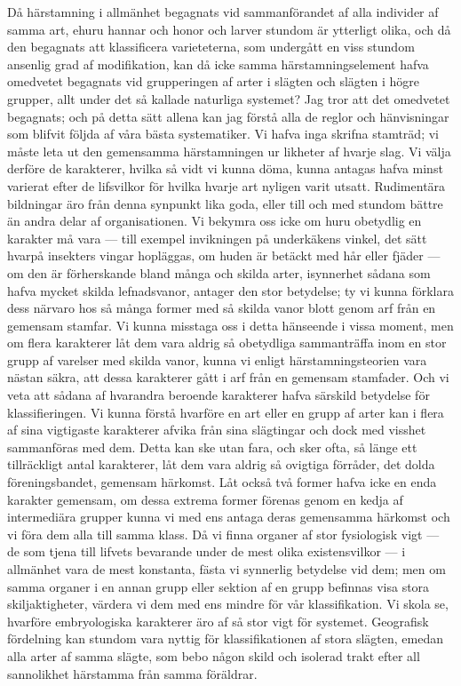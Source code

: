 Då härstamning i allmänhet begagnats vid sammanförandet af alla individer af samma art, ehuru hannar och honor och larver stundom är ytterligt olika, och då den begagnats att klassificera varieteterna, som undergått en viss stundom ansenlig grad af modifikation, kan då icke samma härstamningselement hafva omedvetet begagnats vid grupperingen af arter i slägten och slägten i högre grupper, allt under det så kallade naturliga systemet? Jag tror att det omedvetet begagnats; och på detta sätt allena kan jag förstå alla de reglor och hänvisningar som blifvit följda af våra bästa systematiker. Vi hafva inga skrifna stamträd; vi måste leta ut den gemensamma härstamningen ur likheter af hvarje slag. Vi välja derföre de karakterer, hvilka så vidt vi kunna döma, kunna antagas hafva minst varierat efter de lifsvilkor för hvilka hvarje art nyligen varit utsatt. Rudimentära bildningar äro från denna synpunkt lika goda, eller till och med stundom bättre än andra delar af organisationen. Vi bekymra oss icke om huru obetydlig en karakter må vara — till exempel invikningen på underkäkens vinkel, det sätt hvarpå insekters vingar hopläggas, om huden är betäckt med hår eller fjäder — om den är förherskande bland många och skilda arter, isynnerhet sådana som hafva mycket skilda lefnadsvanor, antager den stor betydelse; ty vi kunna förklara dess närvaro hos så många former med så skilda vanor blott genom arf från en gemensam stamfar. Vi kunna misstaga oss i detta hänseende i vissa moment, men om flera karakterer låt dem vara aldrig så obetydliga sammanträffa inom en stor grupp af varelser med skilda vanor, kunna vi enligt härstamningsteorien vara nästan säkra, att dessa karakterer gått i arf från en gemensam stamfader. Och vi veta att sådana af hvarandra beroende karakterer hafva särskild betydelse för klassifieringen. Vi kunna förstå hvarföre en art eller en grupp af arter kan i flera af sina vigtigaste karakterer afvika från sina slägtingar och dock med visshet sammanföras med dem. Detta kan ske utan fara, och sker ofta, så länge ett tillräckligt antal karakterer, låt dem vara aldrig så ovigtiga förråder, det dolda föreningsbandet, gemensam härkomst. Låt också två former hafva icke en enda karakter gemensam, om dessa extrema former förenas genom en kedja af intermediära grupper kunna vi med ens antaga deras gemensamma härkomst och vi föra dem alla till samma klass. Då vi finna organer af stor fysiologisk vigt — de som tjena till lifvets bevarande under de mest olika existensvilkor — i allmänhet vara de mest konstanta, fästa vi synnerlig betydelse vid dem; men om samma organer i en annan grupp eller sektion af en grupp befinnas visa stora skiljaktigheter, värdera vi dem med ens mindre för vår klassifikation. Vi skola se, hvarföre embryologiska karakterer äro af så stor vigt för systemet. Geografisk fördelning kan stundom vara nyttig för klassifikationen af stora slägten, emedan alla arter af samma slägte, som bebo någon skild och isolerad trakt efter all sannolikhet härstamma från samma föräldrar.



